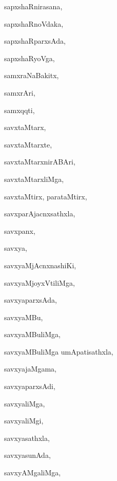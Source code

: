 \begin{multicols}{3}
{\noindent
{sapxshaRnirasana}, \pageref{sapxshaRnirasana}

\noindent
{sapxshaRnoVdaka}, \pageref{sapxshaRnoVdaka}

\noindent
{sapxshaRparxsAda}, \pageref{sapxshaRparxsAda}

\noindent
{sapxshaRyoVga}, \pageref{sapxshaRyoVga}

\noindent
{samxraNaBakitx}, \pageref{samxraNaBakitx}

\noindent
{samxrAri}, \pageref{samxrAri}

\noindent
{samxqqti}, \pageref{samxqqti}

\noindent
{savxtaMtarx}, \pageref{savxtaMtarx}

\noindent
{savxtaMtarxte}, \pageref{savxtaMtarxte}

\noindent
{savxtaMtarxnirABAri}, \pageref{savxtaMtarxnirABAri}

\noindent
{savxtaMtarxliMga}, \pageref{savxtaMtarxliMga}

\noindent
{savxtaMtirx, parataMtirx}, \pageref{savxtaMtirx, parataMtirx}

\noindent
{savxparAjacnxsathxla}, \pageref{savxparAjacnxsathxla}

\noindent
{savxpanx}, \pageref{savxpanx}

\noindent
{savxya}, \pageref{savxya}

\noindent
{savxyaMjAcnxnashiKi}, \pageref{savxyaMjAcnxnashiKi}

\noindent
{savxyaMjoyxVtiliMga}, \pageref{savxyaMjoyxVtiliMga}

\noindent
{savxyaparxsAda}, \pageref{savxyaparxsAda}

\noindent
{savxyaMBu}, \pageref{savxyaMBu}

\noindent
{savxyaMBuliMga}, \pageref{savxyaMBuliMga}

\noindent
{savxyaMBuliMga umApatisathxla}, \pageref{savxyaMBuliMgaumApatisathxla}

\noindent
{savxyajaMgama}, \pageref{savxyajaMgama}

\noindent
{savxyaparxsAdi}, \pageref{savxyaparxsAdi}

\noindent
{savxyaliMga}, \pageref{savxyaliMga}

\noindent
{savxyaliMgi}, \pageref{savxyaliMgi}

\noindent
{savxyasathxla}, \pageref{savxyasathxla}

\noindent
{savxyasunAda}, \pageref{savxyasunAda}

\noindent
{savxyAMgaliMga}, \pageref{savxyAMgaliMga}

}
\end{multicols}
